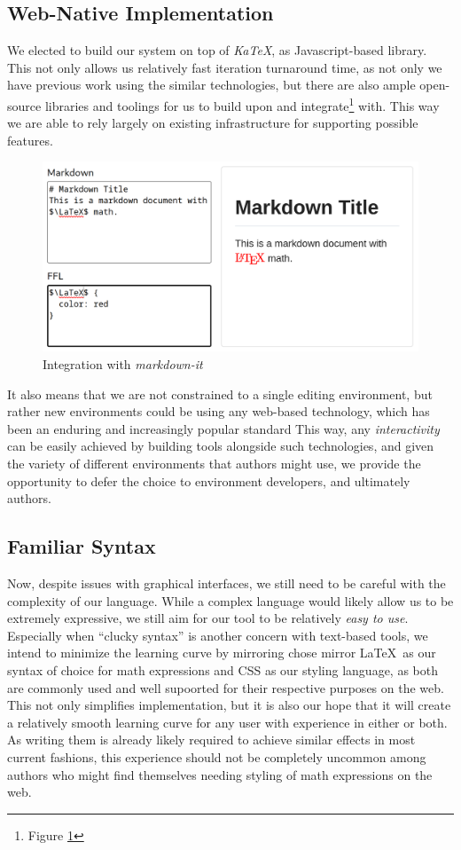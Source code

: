 \documentclass{article}
\begin{document}
\begin{multicols*}{2}
  \subsection*{Web-Native Implementation}
  We elected to build our system on top of \textit{KaTeX}, as Javascript-based library.
  This not only allows us relatively fast iteration turnaround time, as not only we have
  previous work using the similar technologies, but there are also ample open-source libraries
  and toolings for us to build upon and integrate\footnote{Figure \ref{md}} with.
  This way we are able to rely largely on existing infrastructure for supporting
  possible features.
  \begin{figure}[H]
    \includegraphics[width=\columnwidth]{md-int.png}
    \caption{Integration with \textit{markdown-it}\cite{MarkdownIt}}
    \label{md}
  \end{figure}
  \vspace*{-1ex}
  It also means that we are not constrained to a single editing environment,
  but rather new environments could be using any web-based technology,
  which has been an enduring and increasingly popular standard
  This way, any \textit{interactivity} can be easily achieved by building tools alongside such
  technologies, and given the variety of different environments that authors might use,
  we provide the opportunity to defer the choice to environment developers,
  and ultimately authors.
  \subsection*{Familiar Syntax}
  Now, despite issues with graphical interfaces, we still need to be careful with the complexity
  of our language. While a complex language would likely allow us to be extremely expressive,
  we still aim for our tool to be relatively \textit{easy to use}. Especially when
  ``clucky syntax''\cite{MAug} is another concern with text-based tools, we intend to minimize
  the learning curve by mirroring chose mirror \LaTeX\ as our syntax of choice for math expressions
  and CSS as our styling language, as both are commonly used and well supoorted
  for their respective purposes on the web. This not only simplifies implementation,
  but it is also our hope that it will create a relatively smooth learning curve
  for any user with experience in either or both. As writing them is already
  likely required to achieve similar effects in most current fashions, this experience
  should not be completely uncommon among authors who might find themselves needing
  styling of math expressions on the web.

\end{multicols*}
\end{document}
